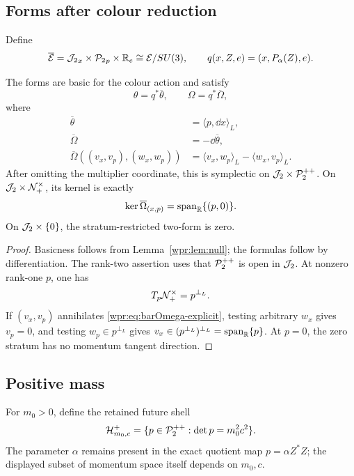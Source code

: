 \subsection{Forms after colour reduction}
Define
\[
 \overline{\mathcal E}
 ={\mathcal J_2}_x\times{\mathcal P_2}_p\times\mathbb R_e
 \cong\mathcal E/SU(3),\qquad
 q(x,Z,e)=(x,P_\alpha(Z),e).
\]

\begin{proposition}
\label{wpr:prop:reduced-forms}
The forms are basic for the colour action and satisfy
\[
 \theta=q^*\overline\theta,\qquad
 \Omega=q^*\overline\Omega,
\]
where
\begin{align}
 \overline\theta&=\langle p,\dd x\rangle_L,\label{wpr:eq:bartheta}\\
 \overline\Omega&=-\dd\overline\theta,\label{wpr:eq:barOmega}\\
 \overline\Omega((v_x,v_p),(w_x,w_p))
 &=\langle v_x,w_p\rangle_L-\langle w_x,v_p\rangle_L.
 \label{wpr:eq:barOmega-explicit}
\end{align}
After omitting the multiplier coordinate, this is symplectic on
\(\mathcal J_2\times\mathcal P_2^{++}\).  On \(\mathcal J_2\times\mathcal N_+^\times\), its kernel is exactly
\[
 \ker\overline\Omega_{(x,p)}=\operatorname{span}_{\mathbb R}\{(p,0)\}.
\]
On \(\mathcal J_2\times\{0\}\), the stratum-restricted two-form is zero.
\end{proposition}
\begin{proof}
Basicness follows from Lemma~\ref{wpr:lem:null}; the formulas follow by
differentiation.  The rank-two assertion uses that \(\mathcal P_2^{++}\) is open in
\(\mathcal J_2\).  At nonzero rank-one \(p\), one has
\[
 T_p\mathcal N_+^\times=p^{\perp_L}.
\]
If \((v_x,v_p)\) annihilates \eqref{wpr:eq:barOmega-explicit}, testing
arbitrary \(w_x\) gives \(v_p=0\), and testing
\(w_p\in p^{\perp_L}\) gives
\(v_x\in(p^{\perp_L})^{\perp_L}=\operatorname{span}_{\mathbb R}\{p\}\).
At \(p=0\), the zero stratum has no momentum tangent direction.
\end{proof}

\subsection{Positive mass}
For \(m_0>0\), define the retained future shell
\[
 \mathcal H^+_{m_0,c}
 =\{p\in\mathcal P_2^{++}:\det p=m_0^2c^2\}.
\]
The parameter \(\alpha\) remains present in the exact quotient map
\(p=\alpha Z^*Z\); the displayed subset of momentum space itself
depends on \(m_0,c\).

